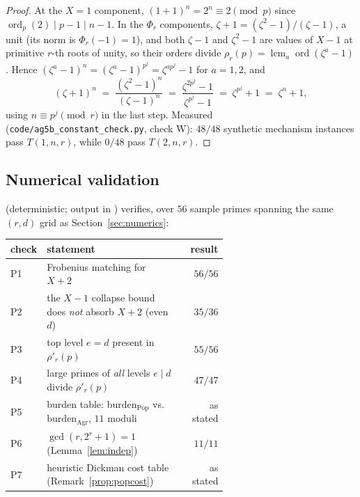 \documentclass[11pt]{article}
\theoremstyle{remark}
\DeclareMathOperator{\lcm}{lcm}
\DeclareMathOperator{\ord}{ord}
\begin{document}
\begin{proof}
At the $X = 1$ component, $(1+1)^n = 2^n \equiv 2 \pmod p$ since
$\ord_p(2) \mid p - 1 \mid n - 1$. In the $\Phi_r$ components,
$\zeta + 1 = (\zeta^2 - 1)/(\zeta - 1)$, a unit (its norm is
$\Phi_r(-1) = 1$), and both $\zeta - 1$ and $\zeta^2 - 1$ are values of
$X - 1$ at primitive $r$-th roots of unity, so their orders divide
$\rho_r(p) = \lcm_a \ord(\zeta^a - 1)$. Hence
$(\zeta^a - 1)^n = (\zeta^a - 1)^{p^j} = \zeta^{a p^j} - 1$ for
$a = 1, 2$, and
\[
(\zeta + 1)^n \;=\; \frac{(\zeta^2 - 1)^n}{(\zeta - 1)^n}
\;=\; \frac{\zeta^{2p^j} - 1}{\zeta^{p^j} - 1}
\;=\; \zeta^{p^j} + 1 \;=\; \zeta^n + 1,
\]
using $n \equiv p^j \pmod r$ in the last step. Measured
(\texttt{code/ag5b\_constant\_check.py}, check W): $48/48$ synthetic
mechanism instances pass $T(1, n, r)$, while $0/48$ pass $T(2, n, r)$.
\end{proof}

\subsection{Numerical validation}\label{sec:popnumerics}

 (deterministic; output in
) verifies, over $56$
sample primes spanning the same $(r,d)$ grid as Section~\ref{sec:numerics}:

\begin{center}
\begin{tabular}{@{}lp{0.62\linewidth}r@{}}
\hline
check & statement & result \\
\hline
P1 & Frobenius matching for $X+2$ & $56/56$ \\
P2 & the $X-1$ collapse bound does \emph{not} absorb $X+2$ (even $d$)
   & $35/36$ \\
P3 & top level $e = d$ present in $\rho'_r(p)$ & $55/56$ \\
P4 & large primes of \emph{all} levels $e \mid d$ divide $\rho'_r(p)$
   & $47/47$ \\
P5 & burden table: $\mathrm{burden}_{\mathrm{Pop}}$ vs.\
     $\mathrm{burden}_{\mathrm{Agr}}$, $11$ moduli & as stated \\
P6 & $\gcd(r, 2^r+1) = 1$ (Lemma~\ref{lem:indep}) & $11/11$ \\
P7 & heuristic Dickman cost table (Remark~\ref{prop:popcost}) & as stated \\
\hline
\end{tabular}
\end{center}
\end{document}
